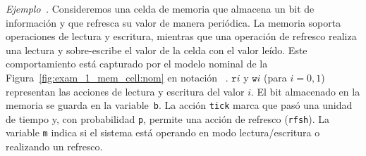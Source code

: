 %
\medskip\par\noindent\textit{Ejemplo~\label{example:memory}\theexample.}
Consideremos una celda de memoria que almacena un bit de información y que refresca su valor de manera periódica.  La memoria soporta operaciones de lectura y escritura, mientras que una operación de refresco realiza una lectura y sobre-escribe el valor de la celda con el valor leído.
%
Este comportamiento está capturado por el modelo nominal de la Figura~\ref{fig:exam_1_mem_cell:nom} en notación {\PRISM}~\cite{DBLP:conf/cav/KwiatkowskaNP11}.  %
$\texttt{r}i$
y $\texttt{w}i$ (para $i=0,1$) representan las acciones de lectura y escritura del valor $i$.  El bit almacenado en la memoria se guarda en la variable~\texttt{b}. La acción \texttt{tick} marca que pasó una unidad de tiempo y, con probabilidad \texttt{p}, permite una acción de refresco (\texttt{rfsh}). La variable \texttt{m}
indica si el sistema está operando en modo lectura/escritura o realizando un refresco.



